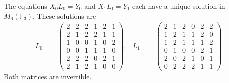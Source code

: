 \begin{theorem}
\label{thm:df-elevaciones-reconstruidas}
The equations \(X_0L_0=Y_0\) and \(X_1L_1=Y_1\) each have a unique
solution in \(M_6(\mathbb F_3)\). These solutions are
\begin{align*}
 L_0&=\begin{pmatrix}
2&2&2&1&2&1\\2&1&2&2&1&1\\1&0&0&1&0&2\\
0&0&1&1&1&0\\2&2&2&0&2&1\\2&1&2&1&0&0
\end{pmatrix},&
 L_1&=\begin{pmatrix}
2&1&2&0&2&2\\1&2&1&1&2&0\\1&2&1&1&1&2\\
0&1&0&0&2&1\\2&0&2&1&0&1\\0&2&2&2&1&1
\end{pmatrix}.
\end{align*}
Both matrices are invertible.
\end{theorem}

